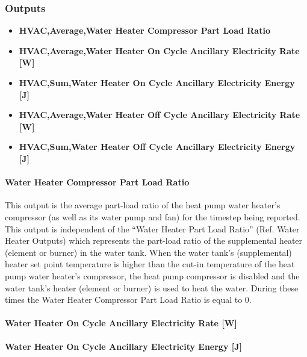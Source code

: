 \subsubsection{Outputs}\label{outputs-2-025}

\begin{itemize}
\item
  \textbf{HVAC,Average,Water Heater Compressor Part Load Ratio}
\item
  \textbf{HVAC,Average,Water Heater On Cycle Ancillary Electricity Rate {[}W{]}}
\item
  \textbf{HVAC,Sum,Water Heater On Cycle Ancillary Electricity Energy {[}J{]}}
\item
  \textbf{HVAC,Average,Water Heater Off Cycle Ancillary Electricity Rate {[}W{]}}
\item
  \textbf{HVAC,Sum,Water Heater Off Cycle Ancillary Electricity Energy {[}J{]}}
\end{itemize}

\paragraph{Water Heater Compressor Part Load Ratio}\label{water-heater-compressor-part-load-ratio}

This output is the average part-load ratio of the heat pump water heater's compressor (as well as its water pump and fan) for the timestep being reported. This output is independent of the ``Water Heater Part Load Ratio'' (Ref. Water Heater Outputs) which represents the part-load ratio of the supplemental heater (element or burner) in the water tank. When the water tank's (supplemental) heater set point temperature is higher than the cut-in temperature of the heat pump water heater's compressor, the heat pump compressor is disabled and the water tank's heater (element or burner) is used to heat the water. During these times the Water Heater Compressor Part Load Ratio is equal to 0.

\paragraph{Water Heater On Cycle Ancillary Electricity Rate {[}W{]}}\label{water-heater-on-cycle-ancillary-electric-power-w}

\paragraph{Water Heater On Cycle Ancillary Electricity Energy {[}J{]}}\label{water-heater-on-cycle-ancillary-electric-energy-j}

